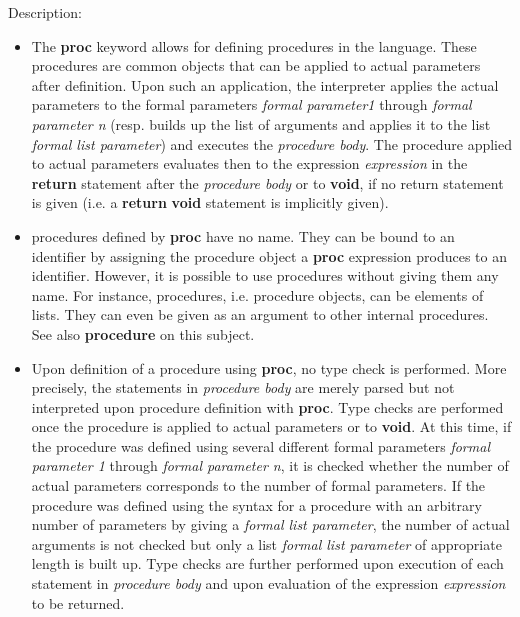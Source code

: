 \noindent Description: \begin{itemize}

\item The \textbf{proc} keyword allows for defining procedures in the \sollya
   language. These procedures are common \sollya objects that can be
   applied to actual parameters after definition. Upon such an
   application, the \sollya interpreter applies the actual parameters to
   the formal parameters \emph{formal parameter1} through \emph{formal parameter n}
   (resp. builds up the list of arguments and applies it to the list
   \emph{formal list parameter}) and executes the \emph{procedure body}. The
   procedure applied to actual parameters evaluates then to the
   expression \emph{expression} in the \textbf{return} statement after the \emph{procedure body} 
   or to \textbf{void}, if no return statement is given (i.e. a \textbf{return}
   \textbf{void} statement is implicitly given).

\item \sollya procedures defined by \textbf{proc} have no name. They can be bound
   to an identifier by assigning the procedure object a \textbf{proc}
   expression produces to an identifier. However, it is possible to use
   procedures without giving them any name. For instance, \sollya
   procedures, i.e. procedure objects, can be elements of lists. They can
   even be given as an argument to other internal \sollya procedures. See
   also \textbf{procedure} on this subject.

\item Upon definition of a \sollya procedure using \textbf{proc}, no type check
   is performed. More precisely, the statements in \emph{procedure body} are
   merely parsed but not interpreted upon procedure definition with
   \textbf{proc}. Type checks are performed once the procedure is applied to
   actual parameters or to \textbf{void}. At this time, if the procedure was
   defined using several different formal parameters \emph{formal parameter 1}
   through \emph{formal parameter n}, it is checked whether the number of
   actual parameters corresponds to the number of formal parameters. If
   the procedure was defined using the syntax for a procedure with an
   arbitrary number of parameters by giving a \emph{formal list parameter},
   the number of actual arguments is not checked but only a list
   \emph{formal list parameter} of appropriate length is built up. Type checks are
   further performed upon execution of each statement in \emph{procedure body}
   and upon evaluation of the expression \emph{expression} to be returned.
    

\end{itemize}
